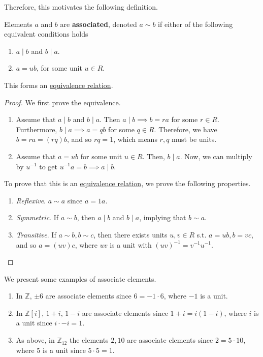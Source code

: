   Therefore, this motivates the following definition. 

  \begin{definition}
    \label{def:associate-elements}
    Elements $a$ and $b$ are \textbf{associated}, denoted $a \sim b$ if either of the following equivalent conditions holds
    \begin{enumerate}
      \item $a \mid b$ and $b \mid a$. 
      \item $a = u b$, for some unit $u \in R$. 
    \end{enumerate}
    This forms an \hyperref[st-def:equivalence_relation]{equivalence relation}. 
  \end{definition} 
  \begin{proof}
    We first prove the equivalence. 
    \begin{enumerate}
      \item Assume that $a \mid b$ and $b \mid a$. Then $a \mid b \implies b = ra$ for some $r \in R$. Furthermore, $b \mid a \implies a = qb$ for some $q \in R$. Therefore, we have $b = ra = (rq)b$, and so $rq = 1$, which means $r, q$ must be units. 
      \item Assume that $a = ub$ for some unit $u \in R$. Then, $b \mid a$. Now, we can multiply by $u^{-1}$ to get $u^{-1} a = b \implies a \mid b$. 
    \end{enumerate}
    To prove that this is an \hyperref[st-def:equivalence_relation]{equivalence relation}, we prove the following properties. 
    \begin{enumerate}
      \item \textit{Reflexive}. $a \sim a$ since $a = 1a$. 
      \item \textit{Symmetric}. If $a \sim b$, then $a \mid b$ and $b \mid a$, implying that $b \sim a$. 
      \item \textit{Transitive}. If $a \sim b, b \sim c$, then there exists units $u, v \in R$ s.t. $a = ub, b = vc$, and so $a = (uv)c$, where $uv$ is a unit with $(uv)^{-1} = v^{-1} u^{-1}$. 
    \end{enumerate}
  \end{proof}

  \begin{example}
    \label{ex:associate-elements-in-a-commutative-ring}
    We present some examples of associate elements. 
    \begin{enumerate}
      \item In $\mathbb{Z}$, $\pm 6$ are associate elements since $6 = -1 \cdot 6$, where $-1$ is a unit. 
      \item In $\mathbb{Z}[i]$, $1 + i$, $1 - i$ are associate elements since $1 + i = i (1 - i)$, where $i$ is a unit since $i \cdot -i = 1$. 
      \item As above, in $\mathbb{Z}_{12}$ the elements $2, 10$ are associate elements since $2 = 5 \cdot 10$, where $5$ is a unit since $5 \cdot 5 = 1$. 
    \end{enumerate}
  \end{example}


